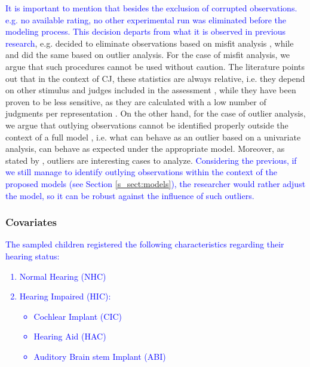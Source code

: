 \textcolor{blue}{It is important to mention that besides the exclusion of corrupted observations. e.g. no available rating, no other experimental run was eliminated before the modeling process. This decision departs from what it is observed in previous research}, e.g. \citet{Boonen_et_al_2020} decided to eliminate observations based on misfit analysis \citep{Lesterhuis_2018}, while \citet{vanDaal_2020} and \citet{Boonen_et_al_2021} did the same based on outlier analysis. For the case of misfit analysis, we argue that such procedures cannot be used without caution. The literature points out that in the context of CJ, these statistics are always relative, i.e. they depend on other stimulus and judges included in the assessment \citep{Pollitt_2012a, Pollitt_2012b}, while they have been proven to be less sensitive, as they are calculated with a low number of judgments per representation \citep{Pollitt_2012a}. On the other hand, for the case of outlier analysis, we argue that outlying observations cannot be identified properly outside the context of a full model \citep{McElreath_2020}, i.e. what can behave as an outlier based on a univariate analysis, can behave as expected under the appropriate model. Moreover, as stated by \citet{McElreath_2020}, outliers are interesting cases to analyze. \textcolor{blue}{Considering the previous, if we still manage to identify outlying observations within the context of the proposed models (see Section \ref{s_sect:models}), the researcher would rather adjust the model, so it can be robust against the influence of such outliers.}
%
%
\subsubsection{Covariates} \label{ss_sect:covariates}
%
\textcolor{blue}{The sampled children registered the following characteristics regarding their hearing status:
	\begin{enumerate}
		\item Normal Hearing (NHC)
		\item Hearing Impaired (HIC):
		\begin{itemize}
			\item Cochlear Implant (CIC) 
			\item Hearing Aid (HAC) 
			\item Auditory Brain stem Implant (ABI)
		\end{itemize}
	\end{enumerate}
}

